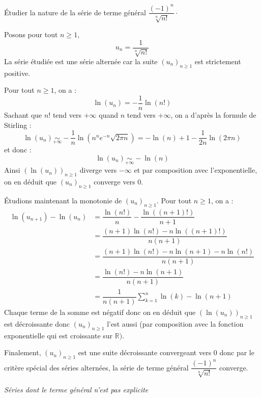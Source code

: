 \documentclass[a4paper,10pt]{report}
\begin{document}
\medskip

\begin{Exercice}{} Étudier la nature de la série de terme général $\dfrac{(-1)^n}{\sqrt[n]{n!}} \cdot$
\end{Exercice}

\corr Posons pour tout $n \geq 1$,
$$ u_n = \dfrac{1}{\sqrt[n]{n!}}$$
La série étudiée est une série alternée car la suite $(u_n)_{n \geq 1}$ est strictement positive. 

\noindent Pour tout $n \geq 1$, on a :
$$ \ln(u_n) = - \dfrac{1}{n} \ln(n!)$$
Sachant que $n!$ tend vers $+ \infty$ quand $n$ tend vers $+ \infty$, on a d'après la formule de Stirling :
$$ \ln(u_n) \underset{+ \infty}{\sim} - \dfrac{1}{n} \ln(n^n e^{-n} \sqrt{2 \pi n}) = - \ln(n) +1 - \dfrac{1}{2n} \ln(2 \pi n)$$
et donc :
$$ \ln(u_n) \underset{+ \infty}{\sim} - \ln(n)$$
Ainsi $(\ln(u_n))_{n \geq 1}$ diverge vers $- \infty$ et par composition avec l'exponentielle, on en déduit que $(u_n)_{n \geq 1}$ converge vers $0$.

\medskip

\noindent Étudions maintenant la monotonie de $(u_n)_{n \geq 1}$. Pour tout $n \geq 1$, on a :
\begin{align*}
\ln(u_{n+1})-\ln(u_n) & = \dfrac{\ln(n!)}{n} - \dfrac{\ln((n+1)!)}{n+1} \\
& = \dfrac{(n+1) \ln(n!)-n \ln((n+1)!)}{n(n+1)} \\
& = \dfrac{(n+1)\ln(n!)-n \ln(n+1)-n \ln(n!)}{n(n+1)} \\
& = \dfrac{\ln(n!)-n \ln(n+1)}{n(n+1)} \\
& = \dfrac{1}{n(n+1)} \sum_{k=1}^n \ln(k) - \ln(n+1) 
\end{align*}
Chaque terme de la somme est négatif donc on en déduit que $(\ln(u_n))_{n \geq 1}$ est décroissante donc $(u_n)_{n \geq 1}$ l'est aussi (par composition avec la fonction exponentielle qui est croissante sur $\mathbb{R})$.

\medskip

\noindent Finalement, $(u_n)_{n \geq 1}$ est une suite décroissante convergeant vers $0$ donc par le critère spécial des séries alternées, la série de terme général $\dfrac{(-1)^n}{\sqrt[n]{n!}}$ converge.

\medskip



\begin{center}
\textit{{ {\large Séries dont le terme général n'est pas explicite}}}
\end{center}
\end{document}
